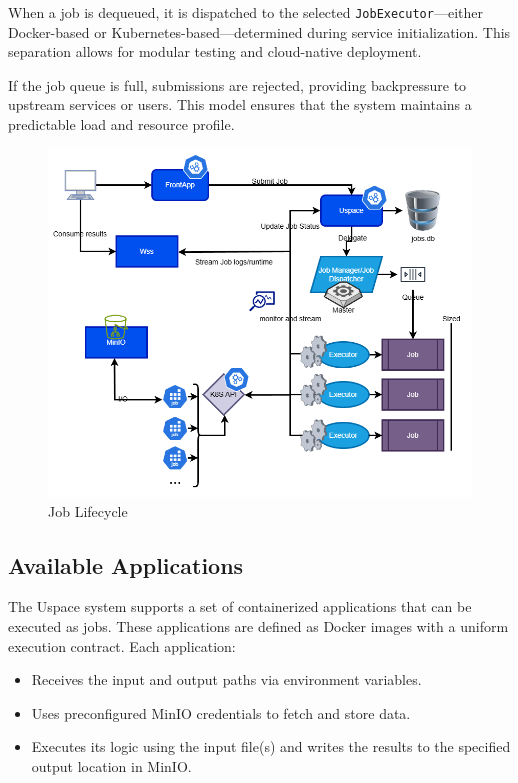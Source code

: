 When a job is dequeued, it is dispatched to the selected \texttt{JobExecutor}—either Docker-based or Kubernetes-based—determined during service initialization. This separation allows for modular testing and cloud-native deployment.

If the job queue is full, submissions are rejected, providing backpressure to upstream services or users. This model ensures that the system maintains a predictable load and resource profile.

\newpage

\begin{figure}[h]
  \centering
  \includegraphics[width=1\textwidth]{Images/job-lifecycle.png}
  \caption{Job Lifecycle}
  \label{fig:job-lifecycle}
\end{figure}


\subsection{Available Applications}

The Uspace system supports a set of containerized applications that can be executed as jobs. These applications are defined as Docker images with a uniform execution contract. Each application:

\begin{itemize}
    \item Receives the input and output paths via environment variables.
    \item Uses preconfigured MinIO credentials to fetch and store data.
    \item Executes its logic using the input file(s) and writes the results to the specified output location in MinIO.
\end{itemize}

